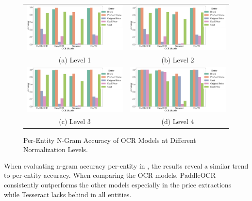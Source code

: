 \documentclass[11pt]{article}
\begin{document}
\begin{figure}[h!]
    \begin{tabular}{cc}
      \includegraphics[width=0.5\linewidth]{figures/ngram_accuracy_level_1.png} &   \includegraphics[width=0.5\linewidth]{figures/ngram_accuracy_level_2.png} \\
    (a) Level 1 & (b) Level 2 \\[6pt]
        \includegraphics[width=0.5\linewidth]{figures/ngram_accuracy_level_3.png} &   \includegraphics[width=0.5\linewidth]{figures/ngram_accuracy_level_4.png} \\
    (c) Level 3 & (d) Level 4 \\[6pt]
    \end{tabular}
    \caption{Per-Entity N-Gram Accuracy of OCR Models at Different Normalization Levels.}
    \label{fig:eval_ocr_ngram_accuracies}
\end{figure}

When evaluating n-gram accuracy per-entity in , the results reveal a similar trend to per-entity accuracy. When comparing the OCR models, PaddleOCR consistently outperforms the other models especially in the price extractions while Tesseract lacks behind in all entities.
\end{document}
